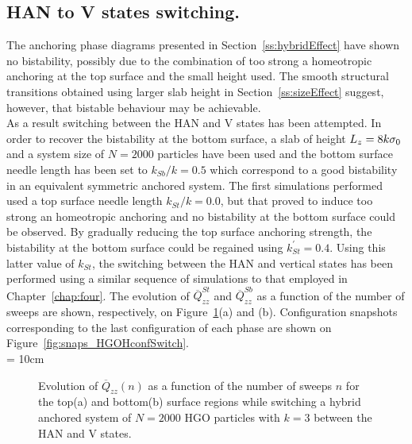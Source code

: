 \subsection{HAN to V states switching.}

The anchoring phase diagrams presented in Section~\ref{ss:hybridEffect} have shown no
bistability, possibly  due to the combination of too strong a homeotropic anchoring at
the top surface and the small height used. The smooth structural transitions obtained using
larger slab height in Section~\ref{ss:sizeEffect} suggest, however, that bistable behaviour may
be achievable.\\ %
As a result switching between the HAN and V states has been attempted. In order to recover the
bistability at the bottom surface, a slab of height $L_z=8k\sigma_0$ and a system size of $N=2000$
particles have been used and the bottom surface needle length has been set to $k_{Sb}/k=0.5$
which correspond to a good bistability in an equivalent symmetric anchored system. The first
simulations performed used a top surface needle length $k_{St}/k = 0.0$, but that proved to
induce too strong an homeotropic anchoring and no bistability at the bottom surface could be
observed. By gradually reducing the top surface anchoring strength, the bistability at the
bottom surface could be regained using $k^\prime_{St}=0.4$.
Using this latter value of $k_{St}$, the switching between the HAN and vertical states has been
performed using a similar sequence of simulations to that employed in Chapter~\ref{chap:four}.
The evolution of $\overline{Q}_{zz}^{St}$ and $\overline{Q}_{zz}^{Sb}$ as a function of the
number of sweeps are shown, respectively, on Figure~\ref{fig:QzzWaEvol_HGOHconfSwitch}(a) and
(b). Configuration snapshots corresponding to the last configuration of each phase
are shown on Figure~\ref{fig:snaps_HGOHconfSwitch}.\\

\picW = 10cm
\begin{figure}
	\centering
	\caption{Evolution of $\overline{Q}_{zz}(n)$ as a function of the number of sweeps $n$ for the
	top(a) and bottom(b) surface regions while switching a hybrid anchored system of
	$N=2000$ HGO particles with $k=3$ between the HAN and V states.}
	\label{fig:QzzWaEvol_HGOHconfSwitch}
\end{figure}


